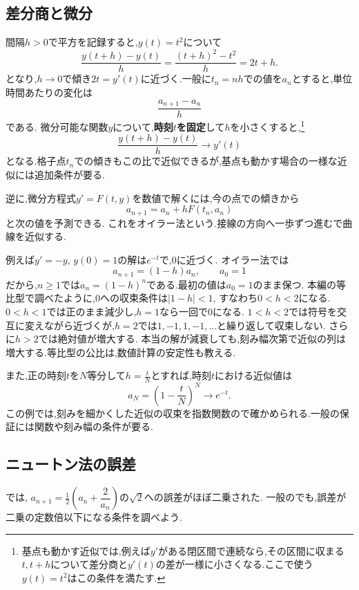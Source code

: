 



\subsection{差分商と微分}
間隔$h>0$で平方を記録すると,$y(t)=t^2$について
\[
  \frac{y(t+h)-y(t)}h
  =\frac{(t+h)^2-t^2}h=2t+h.
\]
となり,$h\to0$で傾き$2t=y'(t)$に近づく.一般に$t_n=nh$での値を$a_n$とすると,単位時間あたりの変化は
\[
  \frac{a_{n+1}-a_n}{h}
\]
である.
微分可能な関数$y$について,\textbf{時刻$t$を固定}して$h$を小さくすると,\footnote{基点も動かす近似では,例えば$y'$がある閉区間で連続なら,その区間に収まる$t,t+h$について差分商と$y'(t)$の差が一様に小さくなる.ここで使う$y(t)=t^2$はこの条件を満たす.}
\[
  \frac{y(t+h)-y(t)}h\longrightarrow y'(t)
\]
となる.格子点$t_n$での傾きもこの比で近似できるが,基点も動かす場合の一様な近似には追加条件が要る.

逆に,微分方程式$y'=F(t,y)$を数値で解くには,今の点での傾きから
\[
  a_{n+1}=a_n+hF(t_n,a_n)
\]
と次の値を予測できる.
これをオイラー法という.接線の方向へ一歩ずつ進むで曲線を近似する.

例えば$y'=-y$, $y(0)=1$の解は$e^{-t}$で,$0$に近づく.
オイラー法では
\[
  a_{n+1}=(1-h)a_n,\qquad a_0=1
\]
だから,$n\ge1$では$a_n=(1-h)^n$である.最初の値は$a_0=1$のまま保つ.
本編の等比型で調べたように,$0$への収束条件は$|1-h|<1$, すなわち$0<h<2$になる.
$0<h<1$では正のまま減少し,$h=1$なら一回で$0$になる.
$1<h<2$では符号を交互に変えながら近づくが,$h=2$では$1,-1,1,-1,\ldots$と繰り返して収束しない.
さらに$h>2$では絶対値が増大する.
本当の解が減衰しても,刻み幅次第で近似の列は増大する.等比型の公比は,数値計算の安定性も教える.

また,正の時刻$t$を$N$等分して$\displaystyle h=\frac{t}{N}$とすれば,時刻$t$における近似値は
\[
  a_N=\left(1-\frac{t}{N}\right)^N
  \longrightarrow e^{-t}.
\]
この例では,刻みを細かくした近似の収束を指数関数ので確かめられる.一般の保証には関数や刻み幅の条件が要る.

\subsection{ニュートン法の誤差}
では,\BookMathLayout{}{\\}%
$a_{n+1}=\frac12\left(a_n+\dfrac{2}{a_n}\right)$の$\sqrt2$への誤差がほぼ二乗された.
一般のでも,誤差が二乗の定数倍以下になる条件を調べよう.

